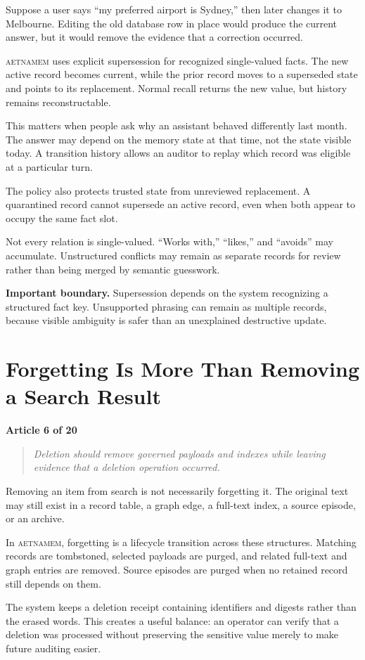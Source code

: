 \documentclass[11pt]{article}
\newcommand{\system}{\textsc{aetnamem}}
\newcommand{\articlelabel}[1]{%
  \noindent\colorbox{aetnaTeal!10}{%
    \parbox{0.96\textwidth}{\color{aetnaInk}\small\textbf{Article #1 of 20}}}%
  \par\medskip}
\newcommand{\coreidea}[1]{%
  \begin{quote}\color{aetnaTeal}\large\itshape #1\end{quote}}
\newcommand{\boundary}[1]{%
  \par\smallskip\noindent\textbf{Important boundary.} #1}
\begin{document}
Suppose a user says ``my preferred airport is Sydney,'' then later changes it
to Melbourne. Editing the old database row in place would produce the current
answer, but it would remove the evidence that a correction occurred.

\system{} uses explicit supersession for recognized single-valued facts. The
new active record becomes current, while the prior record moves to a
superseded state and points to its replacement. Normal recall returns the new
value, but history remains reconstructable.

This matters when people ask why an assistant behaved differently last month.
The answer may depend on the memory state at that time, not the state visible
today. A transition history allows an auditor to replay which record was
eligible at a particular turn.

The policy also protects trusted state from unreviewed replacement. A
quarantined record cannot supersede an active record, even when both appear to
occupy the same fact slot.

Not every relation is single-valued. ``Works with,'' ``likes,'' and ``avoids''
may accumulate. Unstructured conflicts may remain as separate records for
review rather than being merged by semantic guesswork.

\boundary{Supersession depends on the system recognizing a structured fact
key. Unsupported phrasing can remain as multiple records, because visible
ambiguity is safer than an unexplained destructive update.}

\clearpage
\section{Forgetting Is More Than Removing a Search Result}
\articlelabel{6}
\coreidea{Deletion should remove governed payloads and indexes while leaving
evidence that a deletion operation occurred.}

Removing an item from search is not necessarily forgetting it. The original
text may still exist in a record table, a graph edge, a full-text index, a
source episode, or an archive.

In \system{}, forgetting is a lifecycle transition across these structures.
Matching records are tombstoned, selected payloads are purged, and related
full-text and graph entries are removed. Source episodes are purged when no
retained record still depends on them.

The system keeps a deletion receipt containing identifiers and digests rather
than the erased words. This creates a useful balance: an operator can verify
that a deletion was processed without preserving the sensitive value merely
to make future auditing easier.
\end{document}
